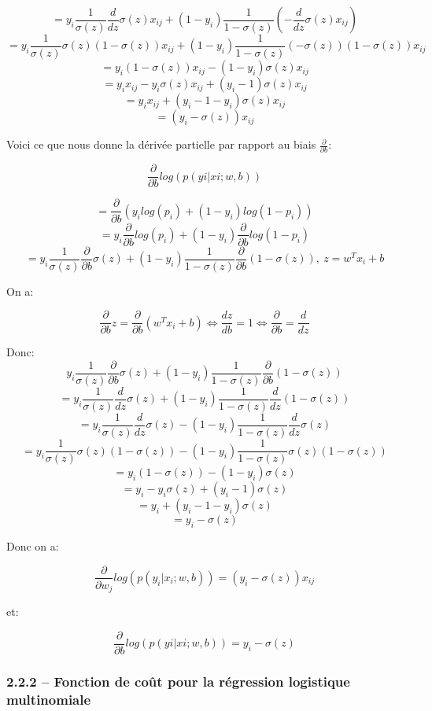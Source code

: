 \documentclass[
]{article}
\begin{document}
\[=y_i \frac{1}{\sigma (z)}\frac{d}{dz}\sigma (z)x_{ij} + (1 - y_i)\frac{1}{1 - \sigma (z)}\left(-\frac{d}{dz} \sigma (z)x_{ij}\right)\]
\[=y_i \frac{1}{\sigma (z)}\sigma (z) (1 - \sigma (z)) x_{ij} + (1 - y_i)\frac{1}{1 - \sigma (z)}(- \sigma (z))(1 - \sigma(z))x_{ij}\]
\[=y_i (1 - \sigma (z)) x_{ij} - (1 - y_i)\sigma (z)x_{ij}\]
\[=y_i x_{ij} - y_i \sigma (z) x_{ij} + (y_i - 1)\sigma (z)x_{ij}\]
\[=y_i x_{ij} + (y_i - 1 - y_i)\sigma (z)x_{ij}\]
\[=(y_i - \sigma(z))x_{ij}\]

Voici ce que nous donne la dérivée partielle par rapport au biais
\(\frac{\partial}{\partial b}\):

\[\frac{\partial}{\partial b}log(p(yi|xi;w,b))\]

\[=\frac{\partial}{\partial b}(y_i log(p_i) + (1 - y_i)log(1 - p_i))\]
\[=y_i \frac{\partial}{\partial b}log(p_i) + (1 - y_i)\frac{\partial}{\partial b}log(1 - p_i)\]
\[=y_i \frac{1}{\sigma (z)}\frac{\partial}{\partial b} \sigma(z) + (1 - y_i) \frac{1}{1 - \sigma (z)} \frac{\partial}{\partial b}(1 - \sigma (z)),\ z = w^T x_i + b\]

On a:

\[\frac{\partial}{\partial b} z = \frac{\partial}{\partial b}(w^T x_i + b) \Leftrightarrow \frac{dz}{db} = 1 \Leftrightarrow \frac{\partial}{\partial b} = \frac{d}{dz}\]

Donc:
\[y_i \frac{1}{\sigma (z)}\frac{\partial}{\partial b} \sigma(z) + (1 - y_i) \frac{1}{1 - \sigma (z)} \frac{\partial}{\partial b}(1 - \sigma (z))\]
\[=y_i \frac{1}{\sigma (z)}\frac{d}{dz} \sigma(z) + (1 - y_i) \frac{1}{1 - \sigma (z)} \frac{d}{dz}(1 - \sigma (z))\]
\[=y_i \frac{1}{\sigma (z)}\frac{d}{dz} \sigma(z) - (1 - y_i) \frac{1}{1 - \sigma (z)} \frac{d}{dz}\sigma (z)\]
\[=y_i \frac{1}{\sigma (z)}\sigma(z) (1 - \sigma (z)) - (1 - y_i) \frac{1}{1 - \sigma (z)} \sigma (z)(1 - \sigma (z))\]
\[=y_i (1 - \sigma (z)) - (1 - y_i)\sigma (z)\]
\[=y_i - y_i \sigma (z) + (y_i - 1)\sigma (z)\]
\[=y_i + (y_i - 1 - y_i)\sigma (z)\] \[=y_i - \sigma (z)\]

Donc on a:

\[\frac{\partial}{\partial w_j}log(p(y_i|x_i;w,b)) = (y_i - \sigma(z))x_{ij}\]

et:

\[\frac{\partial}{\partial b}log(p(yi|xi;w,b)) = y_i - \sigma (z)\]

\hypertarget{fonction-de-couxfbt-pour-la-ruxe9gression-logistique-multinomiale}{%
\subsubsection{2.2.2 -- Fonction de coût pour la régression logistique
multinomiale}\label{fonction-de-couxfbt-pour-la-ruxe9gression-logistique-multinomiale}}
\end{document}
